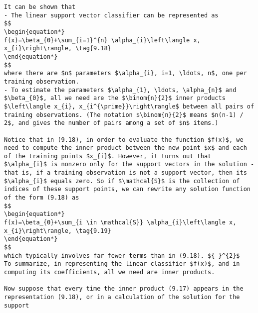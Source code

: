 \documentclass[10pt]{article}
\begin{document}
\begin{verbatim}
It can be shown that
- The linear support vector classifier can be represented as
$$
\begin{equation*}
f(x)=\beta_{0}+\sum_{i=1}^{n} \alpha_{i}\left\langle x, x_{i}\right\rangle, \tag{9.18}
\end{equation*}
$$
where there are $n$ parameters $\alpha_{i}, i=1, \ldots, n$, one per training observation.
- To estimate the parameters $\alpha_{1}, \ldots, \alpha_{n}$ and $\beta_{0}$, all we need are the $\binom{n}{2}$ inner products $\left\langle x_{i}, x_{i^{\prime}}\right\rangle$ between all pairs of training observations. (The notation $\binom{n}{2}$ means $n(n-1) / 2$, and gives the number of pairs among a set of $n$ items.)

Notice that in (9.18), in order to evaluate the function $f(x)$, we need to compute the inner product between the new point $x$ and each of the training points $x_{i}$. However, it turns out that $\alpha_{i}$ is nonzero only for the support vectors in the solution - that is, if a training observation is not a support vector, then its $\alpha_{i}$ equals zero. So if $\mathcal{S}$ is the collection of indices of these support points, we can rewrite any solution function of the form (9.18) as
$$
\begin{equation*}
f(x)=\beta_{0}+\sum_{i \in \mathcal{S}} \alpha_{i}\left\langle x, x_{i}\right\rangle, \tag{9.19}
\end{equation*}
$$
which typically involves far fewer terms than in (9.18). ${ }^{2}$
To summarize, in representing the linear classifier $f(x)$, and in computing its coefficients, all we need are inner products.

Now suppose that every time the inner product (9.17) appears in the representation (9.18), or in a calculation of the solution for the support


\end{verbatim}
\end{document}
